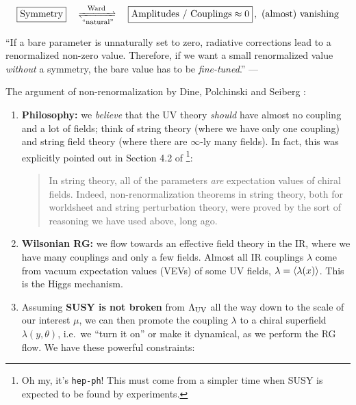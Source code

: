 \documentclass[a4paper
	,10pt
]{article}
\makeatletter
\newcommand{\nobeginpar}{\@beginparpenalty=10000}
\makeatother
\begin{document}
	\begin{equation}
		\boxed{\text{Symmetry}}
		\quad\xrightleftharpoons[
			\text{``natural''}
		]{\text{Ward}}\quad
		\boxed{\text{Amplitudes / Couplings} \approx 0}\,,
		\ \text{(almost) vanishing}
	\end{equation}
	
	``If a bare parameter is unnaturally set to zero, radiative corrections lead to a renormalized non-zero value. Therefore, if we want a small renormalized value \textit{without} a symmetry, the bare value has to be \textit{fine-tuned}.'' --- \textcite{Seiberg:1993vc}
	
{\nobeginpar
	The argument of non-renormalization by Dine, Polchinski and Seiberg \cite{Seiberg:1993vc}: 
	
	\begin{enumerate}
	\item \textbf{Philosophy:} we \textit{believe} that the UV theory \textit{should} have almost no coupling and a lot of fields; think of string theory (where we have only one coupling) and string field theory (where there are $\infty$-ly many fields). In fact, this was explicitly pointed out in Section 4.2 of \mbox{\textcite{Dine:1996ui}}\footnote{
		Oh my, it's \texttt{hep-ph}! This must come from a simpler time when SUSY is expected to be found by experiments. 
	}:
	
		\begin{quote}
			In string theory, all of the parameters \textit{are} expectation values of chiral fields.
			Indeed, non-renormalization theorems in string theory, both for worldsheet and string perturbation theory, were proved by the sort of reasoning we have used above, long ago. 
		\end{quote}
	
	\item \textbf{Wilsonian RG:} we flow towards an effective field theory in the IR, where we have many couplings and only a few fields. Almost all IR couplings $\lambda$ come from vacuum expectation values (VEVs) of some UV fields, $\lambda = \langle\lambda(x)\rangle$. This is the Higgs mechanism. 
	
	\item Assuming \textbf{SUSY is not broken} from $\Lambda_{\mathrm{UV}}$ all the way down to the scale of our interest $\mu$, we can then promote the coupling $\lambda$ to a chiral superfield $\lambda(y,\theta)$, i.e.~we ``turn it on'' or make it dynamical, as we perform the RG flow. We have these powerful constraints:
	

\end{enumerate}}
\end{document}
